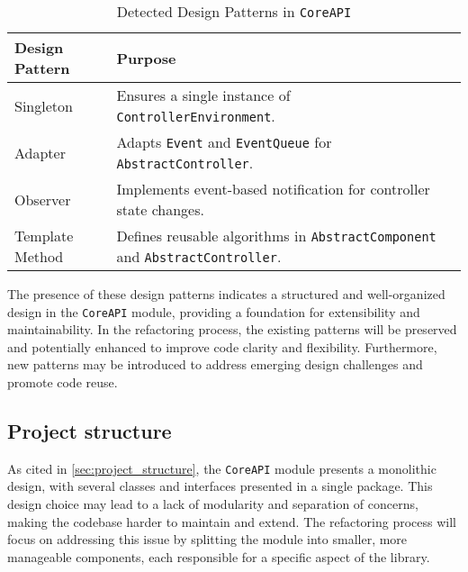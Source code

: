 \begin{table}[h!]
	\centering
	\label{tab:pattern_summary}
	\begin{tabular}{|l|l|}
		\hline
		\textbf{Design Pattern} & \textbf{Purpose}                                                                           \\ \hline
		Singleton               & Ensures a single instance of \texttt{ControllerEnvironment}.                               \\ \hline
		Adapter                 & Adapts \texttt{Event} and \texttt{EventQueue} for \texttt{AbstractController}.             \\ \hline
		Observer                & Implements event-based notification for controller state changes.                          \\ \hline
		Template Method         & Defines reusable algorithms in \texttt{AbstractComponent} and \texttt{AbstractController}. \\ \hline
	\end{tabular}
	\caption{Detected Design Patterns in \texttt{CoreAPI}}
\end{table}

The presence of these design patterns indicates a structured and well-organized design in the \texttt{CoreAPI} module, providing a foundation for extensibility and maintainability. In the refactoring process, the existing patterns will be preserved and potentially enhanced to improve code clarity and flexibility. Furthermore, new patterns may be introduced to address emerging design challenges and promote code reuse.

\subsection{Project structure}

As cited in \autoref{sec:project_structure}, the \texttt{CoreAPI} module presents a monolithic design, with several classes and interfaces presented in a single package. This design choice may lead to a lack of modularity and separation of concerns, making the codebase harder to maintain and extend. The refactoring process will focus on addressing this issue by splitting the module into smaller, more manageable components, each responsible for a specific aspect of the library.

